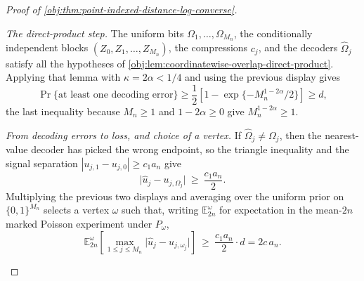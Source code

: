 \begin{proof}[Proof of \cref{obj:thm:point-indexed-distance-log-converse}]
\begin{enumerate}
\emph{The direct-product step.}  The uniform bits \(\Omega_1,\ldots,\Omega_{M_n}\), the conditionally independent blocks \((Z_0,Z_1,\ldots,Z_{M_n})\), the compressions \(c_j\), and the decoders \(\widehat\Omega_j\) satisfy all the hypotheses of \cref{obj:lem:coordinatewise-overlap-direct-product}.  Applying that lemma with \(\kappa=2\alpha<1/4\) and using the previous display gives
\[
\Pr\{\text{at least one decoding error}\}
\ge
\frac12\left[1-\exp\{-M_n^{1-2\alpha}/2\}\right]
\ge d,
\]
the last inequality because \(M_n\ge1\) and \(1-2\alpha\ge0\) give \(M_n^{1-2\alpha}\ge1\).

\emph{From decoding errors to loss, and choice of a vertex.}  If \(\widehat\Omega_j\ne\Omega_j\), then the nearest-value decoder has picked the wrong endpoint, so the triangle inequality and the signal separation \(|u_{j,1}-u_{j,0}|\ge c_1a_n\) give
\[
\bigl|\widehat u_j-u_{j,\Omega_j}\bigr|\ \ge\ \frac{c_1a_n}{2}.
\]
Multiplying the previous two displays and averaging over the uniform prior on \(\{0,1\}^{M_n}\) selects a vertex \(\omega\) such that, writing \(\mathbb E^{\omega}_{2n}\) for expectation in the mean-\(2n\) marked Poisson experiment under \(P_\omega\),
\[
\mathbb E^{\omega}_{2n}\!\left[\max_{1\le j\le M_n}\bigl|\widehat u_j-u_{j,\omega_j}\bigr|\right]
\ \ge\
\frac{c_1a_n}{2}\cdot d
=
2c\,a_n .
\]


\end{enumerate}
\end{proof}
